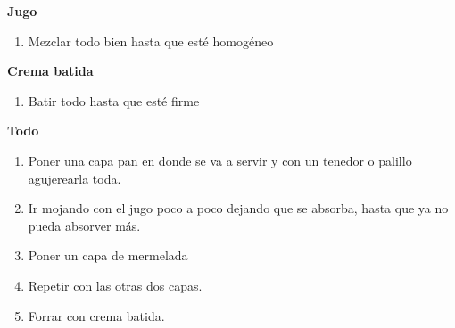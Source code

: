 \textbf{Jugo}
\begin{enumerate}
\item Mezclar todo bien hasta que esté homogéneo
\end{enumerate}

\textbf{Crema batida}
\begin{enumerate}
\item Batir todo hasta que esté firme
\end{enumerate}

\textbf{Todo}
\begin{enumerate}
\item Poner una capa pan en donde se va a servir y con un tenedor o palillo agujerearla toda.
\item Ir mojando con el jugo poco a poco dejando que se absorba, hasta que ya no pueda absorver más.
\item Poner un capa de mermelada
\item Repetir con las otras dos capas.
\item Forrar con crema batida.
\end{enumerate}